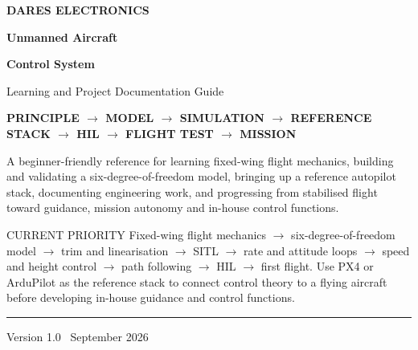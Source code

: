 \documentclass[11pt,a4paper]{article}
\begin{document}
\hypersetup{pageanchor=false}

\begin{titlepage}
  \thispagestyle{empty}
  \pagecolor{DARESPaper}
  \color{DARESNavy}

  \vspace*{20mm}
  {\large\bfseries\color{DARESTeal}DARES ELECTRONICS\par}
  \vspace{12mm}

  {\fontsize{30}{34}\selectfont\bfseries Unmanned Aircraft\par}
  \vspace{1mm}
  {\fontsize{30}{34}\selectfont\bfseries Control System\par}
  \vspace{3mm}
  {\Large\color{DARESMuted}Learning and Project Documentation Guide\par}

  \vspace{15mm}
  \begin{tcolorbox}[
    colback=DARESNavy,
    colframe=DARESNavy,
    arc=0pt,
    boxrule=0pt,
    left=4mm,right=4mm,top=4mm,bottom=4mm]
    \centering\bfseries\color{white}
    PRINCIPLE \(\rightarrow\) MODEL \(\rightarrow\) SIMULATION
    \(\rightarrow\) REFERENCE STACK \(\rightarrow\) HIL \(\rightarrow\) FLIGHT TEST
    \(\rightarrow\) MISSION
  \end{tcolorbox}

  \vspace{15mm}
  {\large\color{DARESMuted}
    A beginner-friendly reference for learning fixed-wing flight mechanics,
    building and validating a six-degree-of-freedom model, bringing up a
    reference autopilot stack, documenting engineering work, and progressing
    from stabilised flight toward guidance, mission autonomy and in-house
    control functions.
    \par}

  \vfill
  \begin{callout}{CURRENT PRIORITY}
    Fixed-wing flight mechanics \(\rightarrow\) six-degree-of-freedom model
    \(\rightarrow\) trim and linearisation \(\rightarrow\) SITL
    \(\rightarrow\) rate and attitude loops \(\rightarrow\) speed and height
    control \(\rightarrow\) path following \(\rightarrow\) HIL
    \(\rightarrow\) first flight. Use PX4 or ArduPilot as the reference stack to
    connect control theory to a flying aircraft before developing in-house
    guidance and control functions.
  \end{callout}

  \vfill
  {\color{DARESCoral}\rule{32mm}{2pt}\par}
  \vspace{3mm}
  {\small\color{DARESMuted}Version 1.0 \textbar\ September 2026\par}
\end{titlepage}
\nopagecolor
\hypersetup{pageanchor=true}
\end{document}
